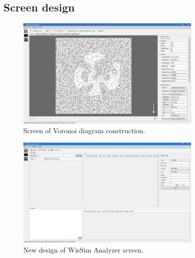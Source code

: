 \subsection{Screen design}
\begin{figure}[!htb]
\centering
\includegraphics[width=0.8\textwidth]{Chapter5/Chapter5Figs/wissim-voronoi.png}
\caption{Screen of Voronoi diagram construction.}
\end{figure}

\begin{figure}[!htb]
\centering
\includegraphics[width=0.8\textwidth]{Chapter5/Chapter5Figs/wissim-analyzer.png}
\caption{New design of WisSim Analyzer screen.}
\end{figure}